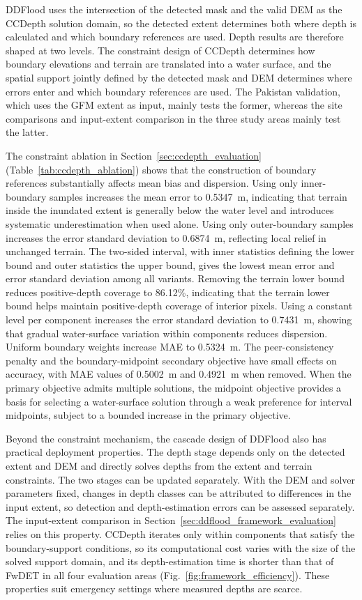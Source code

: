 \documentclass[authoryear,preprint,12pt]{elsarticle}
\begin{document}
DDFlood uses the intersection of the detected mask and the valid DEM as the CCDepth solution domain, so the detected extent determines both where depth is calculated and which boundary references are used. Depth results are therefore shaped at two levels. The constraint design of CCDepth determines how boundary elevations and terrain are translated into a water surface, and the spatial support jointly defined by the detected mask and DEM determines where errors enter and which boundary references are used. The Pakistan validation, which uses the GFM extent as input, mainly tests the former, whereas the site comparisons and input-extent comparison in the three study areas mainly test the latter.

The constraint ablation in Section~\ref{sec:ccdepth_evaluation} (Table~\ref{tab:ccdepth_ablation}) shows that the construction of boundary references substantially affects mean bias and dispersion. Using only inner-boundary samples increases the mean error to 0.5347~m, indicating that terrain inside the inundated extent is generally below the water level and introduces systematic underestimation when used alone. Using only outer-boundary samples increases the error standard deviation to 0.6874~m, reflecting local relief in unchanged terrain. The two-sided interval, with inner statistics defining the lower bound and outer statistics the upper bound, gives the lowest mean error and error standard deviation among all variants. Removing the terrain lower bound reduces positive-depth coverage to 86.12\%, indicating that the terrain lower bound helps maintain positive-depth coverage of interior pixels. Using a constant level per component increases the error standard deviation to 0.7431~m, showing that gradual water-surface variation within components reduces dispersion. Uniform boundary weights increase MAE to 0.5324~m. The peer-consistency penalty and the boundary-midpoint secondary objective have small effects on accuracy, with MAE values of 0.5002~m and 0.4921~m when removed. When the primary objective admits multiple solutions, the midpoint objective provides a basis for selecting a water-surface solution through a weak preference for interval midpoints, subject to a bounded increase in the primary objective.

Beyond the constraint mechanism, the cascade design of DDFlood also has practical deployment properties. The depth stage depends only on the detected extent and DEM and directly solves depths from the extent and terrain constraints. The two stages can be updated separately. With the DEM and solver parameters fixed, changes in depth classes can be attributed to differences in the input extent, so detection and depth-estimation errors can be assessed separately. The input-extent comparison in Section~\ref{sec:ddflood_framework_evaluation} relies on this property. CCDepth iterates only within components that satisfy the boundary-support conditions, so its computational cost varies with the size of the solved support domain, and its depth-estimation time is shorter than that of FwDET in all four evaluation areas (Fig.~\ref{fig:framework_efficiency}). These properties suit emergency settings where measured depths are scarce.
\end{document}
